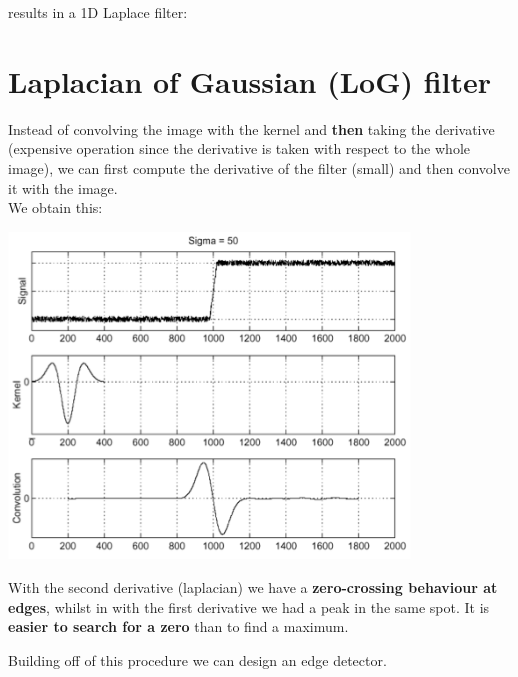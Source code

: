 \documentclass{article}
\begin{document}
results in a 1D Laplace filter:

\begin{center}
\end{center}

\newpage

\section*{Laplacian of Gaussian (LoG) filter}

Instead of convolving the image with the kernel and \textbf{then} taking the derivative (expensive operation since the derivative is taken with respect to the whole image), we can first compute the derivative of the filter (small) and then convolve it with the image. \\

We obtain this:
\begin{center}
\includegraphics[width=0.8\textwidth]{images/laplacian_derivative.png}
\end{center}

With the second derivative (laplacian) we have a \textbf{zero-crossing behaviour at edges}, whilst in with the first derivative we had a peak in the same spot. It is \textbf{easier to search for a zero} than to find a maximum.

Building off of this procedure we can design an edge detector.
\end{document}
